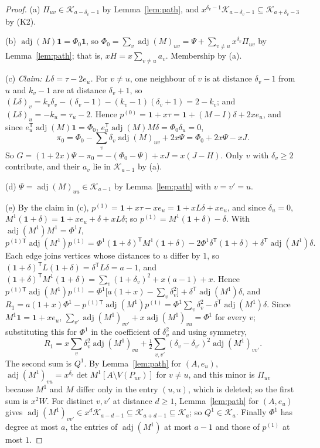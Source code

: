 \documentclass[11pt]{amsart}
\theoremstyle{definition}
\theoremstyle{remark}
\newcommand{\adj}{\operatorname{adj}}
\newcommand{\K}{\mathcal K}
\newcommand{\one}{\mathbf 1}
\newcommand{\T}{\mathsf T}
\begin{document}
\begin{proof}
(a) $\Pi_{uv}\in\K_{a-\delta_v-1}$ by Lemma~\ref{lem:path}, and
$x^{\delta_v-1}\K_{a-\delta_v-1}\subseteq\K_{a+\delta_v-3}$ by (K2).

(b) $\adj(M)\one=\Phi_0\one$, so $\Phi_0=\sum_v\adj(M)_{uv}=\Psi+\sum_{v\ne u}x^{\delta_v}\Pi_{uv}$
by Lemma~\ref{lem:path}; that is, $xH=x\sum_{v\ne u}a_v$. Membership by (a).

(c) \emph{Claim: $L\delta=\tau-2e_u$.} For $v\ne u$, one neighbour of $v$ is at
distance $\delta_v-1$ from $u$ and $k_v-1$ are at distance $\delta_v+1$, so
$(L\delta)_v=k_v\delta_v-(\delta_v-1)-(k_v-1)(\delta_v+1)=2-k_v$; and
$(L\delta)_u=-k_u=\tau_u-2$. Hence $p^{(0)}=\one+x\tau=\one+(M-I)\delta+2xe_u$,
and since $e_u^\T\adj(M)\one=\Phi_0$, $e_u^\T\adj(M)M\delta=\Phi_0\delta_u=0$,
\[
\pi_0=\Phi_0-\sum_v\delta_v\adj(M)_{uv}+2x\Psi=\Phi_0+2x\Psi-xJ .
\]
So $G=(1+2x)\Psi-\pi_0=-(\Phi_0-\Psi)+xJ=x(J-H)$. Only $v$ with
$\delta_v\ge2$ contribute, and their $a_v$ lie in $\K_{a-1}$ by (a).

(d) $\Psi=\adj(M)_{uu}\in\K_{a-1}$ by Lemma~\ref{lem:path} with $v=v'=u$.

(e) By the claim in (c), $p^{(1)}=\one+x\tau-xe_u=\one+xL\delta+xe_u$, and
since $\delta_u=0$, $M^1(\one+\delta)=\one+xe_u+\delta+xL\delta$; so
$p^{(1)}=M^1(\one+\delta)-\delta$. With $\adj(M^1)M^1=\Phi^1I$,
\[
p^{(1)\T}\adj(M^1)p^{(1)}=\Phi^1(\one+\delta)^\T M^1(\one+\delta)-2\Phi^1\delta^\T(\one+\delta)+\delta^\T\adj(M^1)\delta .
\]
Each edge joins vertices whose distances to $u$ differ by $1$, so
$(\one+\delta)^\T L(\one+\delta)=\delta^\T L\delta=a-1$, and
$(\one+\delta)^\T M^1(\one+\delta)=\sum_v(1+\delta_v)^2+x(a-1)+x$. Hence
$p^{(1)\T}\adj(M^1)p^{(1)}=\Phi^1\bigl[a(1+x)-\sum_v\delta_v^2\bigr]+\delta^\T\adj(M^1)\delta$,
and $R_1=a(1+x)\Phi^1-p^{(1)\T}\adj(M^1)p^{(1)}=\Phi^1\sum_v\delta_v^2-\delta^\T\adj(M^1)\delta$.
Since $M^1\one=\one+xe_u$, $\sum_{v'}\adj(M^1)_{vv'}+x\adj(M^1)_{vu}=\Phi^1$ for
every $v$; substituting this for $\Phi^1$ in the coefficient of
$\delta_v^2$ and using symmetry,
\[
R_1=x\sum_v\delta_v^2\adj(M^1)_{vu}+\tfrac12\sum_{v,v'}(\delta_v-\delta_{v'})^2\adj(M^1)_{vv'} .
\]
The second sum is $Q^1$. By Lemma~\ref{lem:path} for $(A,e_u)$,
$\adj(M^1)_{vu}=x^{\delta_v}\det M^1[A\setminus V(P_{uv})]$ for $v\ne u$, and
this minor is $\Pi_{uv}$ because $M^1$ and $M$ differ only in the entry
$(u,u)$, which is deleted; so the first sum is $x^2W$. For distinct $v,v'$ at
distance $d\ge1$, Lemma~\ref{lem:path} for $(A,e_u)$ gives
$\adj(M^1)_{vv'}\in x^d\K_{a-d-1}\subseteq\K_{a+d-1}\subseteq\K_a$; so
$Q^1\in\K_a$. Finally $\Phi^1$ has degree at most $a$, the entries of
$\adj(M^1)$ at most $a-1$ and those of $p^{(1)}$ at most $1$.
\end{proof}
\end{document}
